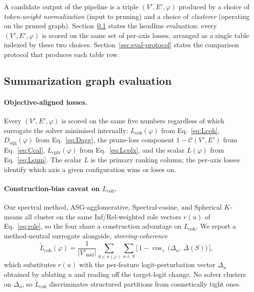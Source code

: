 A candidate output of the pipeline is a triple $(V', E', \varphi)$
produced by a choice of \emph{token-weight normalization} (input to
pruning) and a choice of \emph{clusterer} (operating on the pruned
graph). Section~\ref{sec:eval-graph} states the headline evaluation:
every $(V', E', \varphi)$ is scored on the same set of per-axis losses,
arranged as a single table indexed by these two choices. Section~\ref{sec:eval-protocol}
states the comparison protocol that produces each table row.

\subsection{Summarization graph evaluation}\label{sec:eval-graph}

\paragraph{Objective-aligned losses.}
Every $(V', E', \varphi)$ is scored on the same five numbers regardless
of which surrogate the solver minimised internally:
$L_{\text{coh}}(\varphi)$ from Eq.~\eqref{eq:Lcoh},
$D_{\text{agg}}(\varphi)$ from Eq.~\eqref{eq:Dagg},
the prune-loss component $1 - \mathcal{C}(V', E')$ from
Eq.~\eqref{eq:Ccal}, $L_{\text{cplx}}(\varphi)$ from
Eq.~\eqref{eq:Lcplx}, and the scalar $L(\varphi)$ from
Eq.~\eqref{eq:Lsum}. The scalar $L$ is the primary ranking column; the
per-axis losses identify which axis a given configuration wins or loses
on.

\paragraph{Construction-bias caveat on $L_{\text{coh}}$.}
Our spectral method, ASG-agglomerative, Spectral-cosine, and Spherical
$K$-means all cluster on the same Inf/Rel-weighted role vectors $r(u)$
of Eq.~\eqref{eq:role}, so the four share a construction advantage on
$L_{\text{coh}}$. We report a method-neutral surrogate alongside,
\emph{steering-coherence}
\begin{equation}
\tilde{L}_{\text{coh}}(\varphi)
= \frac{1}{|V'_{\text{mid}}|}
  \sum_{S \in \pi(\varphi)} \sum_{u \in S}
  \bigl[\,1 - \cos_{+}\!\bigl(\Delta_u,\, \bar\Delta(S)\bigr)\,\bigr],
\label{eq:Lcoh-tilde}
\end{equation}
which substitutes $r(u)$ with the per-feature logit-perturbation vector
$\Delta_u$ obtained by ablating $u$ and reading off the target-logit
change. No solver clusters on $\Delta_u$, so $\tilde{L}_{\text{coh}}$
discriminates structured partitions from cosmetically tight ones.

